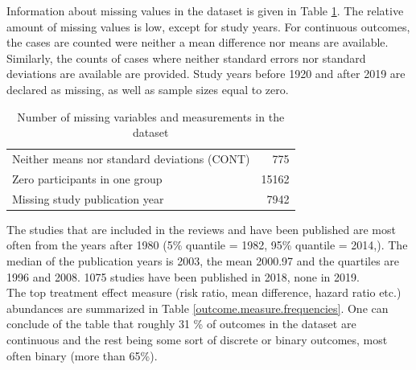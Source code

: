 \documentclass[11pt,a4paper,twoside]{book}\usepackage[]{graphicx}\usepackage[]{color}
\begin{document}
Information about missing values in the dataset is given in Table \ref{missing}. The relative amount of missing values is low, except for study years. For continuous outcomes, the cases are counted were neither a mean difference nor means are available. Similarly, the counts of cases where neither standard errors nor standard deviations are available are provided. Study years before 1920 and after 2019 are declared as missing, as well as sample sizes equal to zero.

\begin{table}[ht]
\centering
\begingroup\footnotesize
\begin{tabular}{lr}
  \hline
  \hline
Neither means nor standard deviations (CONT) & 775 \\ 
  Zero participants in one group & 15162 \\ 
  Missing study publication year & 7942 \\ 
   \hline
\end{tabular}
\endgroup
\caption{Number of missing variables and measurements in the dataset} 
\label{missing}
\end{table}


The studies that are included in the reviews and have been published are most often from the years after 1980 (5\% quantile = 1982, 95\% quantile = 2014,). The median of the publication years is 2003, the mean 2000.97 and the quartiles are 1996 and 2008. 1075 studies have been published in 2018, none in 2019.\\
The top treatment effect measure (risk ratio, mean difference, hazard ratio etc.) abundances are summarized in Table \ref{outcome.measure.frequencies}. One can conclude of the table that roughly 31 \% of outcomes in the dataset are continuous and the rest being some sort of discrete or binary outcomes, most often binary (more than 65\%).
\end{document}
